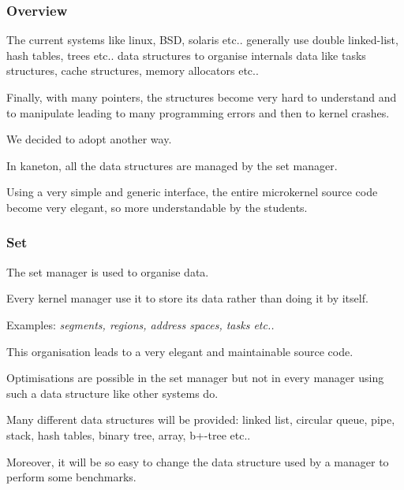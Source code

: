 \begin{frame}
  \frametitle{Overview}

  The current systems like linux, BSD, solaris etc.. generally use
  double linked-list, hash tables, trees etc.. data structures to
  organise internals data like tasks structures, cache structures,
  memory allocators etc..

  \nl

  Finally, with many pointers, the structures become very hard to understand
  and to manipulate leading to many programming errors and then to kernel
  crashes.

  \nl

  We decided to adopt another way.

  \nl

  In kaneton, all the data structures are managed by the set manager.

  \nl

  Using a very simple and generic interface, the entire microkernel source
  code become very elegant, so more understandable by the students.
\end{frame}


\begin{frame}
  \frametitle{Set}

  The set manager is used to organise data.

  \nl

  Every kernel manager use it to store its data rather than doing it
  by itself.

  \nl

  Examples: \textit{segments, regions, address spaces, tasks etc..}

  \nl

  This organisation leads to a very elegant and maintainable source code.

  \nl

  Optimisations are possible in the set manager \alert{but} not in every
  manager using such a data structure like other systems do.

  \nl

  Many different data structures will be provided: linked list, circular
  queue, pipe, stack, hash tables, binary tree, array, b+-tree etc..

  \nl

  Moreover, it will be so easy to change the data structure used by a manager
  to perform some benchmarks.
\end{frame}

